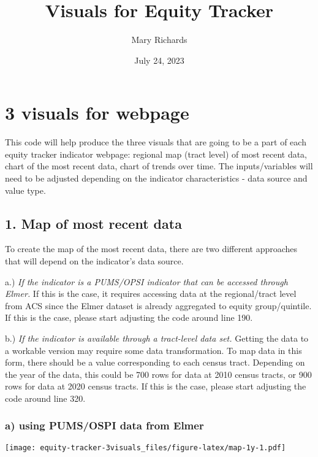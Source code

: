 \documentclass[
]{article}
\title{Visuals for Equity Tracker}
\author{Mary Richards}
\date{July 24, 2023}
\begin{document}
\maketitle

{
\setcounter{tocdepth}{6}
\tableofcontents
}
\hypertarget{visuals-for-webpage}{%
\section{3 visuals for webpage}\label{visuals-for-webpage}}

This code will help produce the three visuals that are going to be a
part of each equity tracker indicator webpage: regional map (tract
level) of most recent data, chart of the most recent data, chart of
trends over time. The inputs/variables will need to be adjusted
depending on the indicator characteristics - data source and value type.

\hypertarget{map-of-most-recent-data}{%
\subsection{1. Map of most recent data}\label{map-of-most-recent-data}}

To create the map of the most recent data, there are two different
approaches that will depend on the indicator's data source.

a.) \emph{If the indicator is a PUMS/OPSI indicator that can be accessed
through Elmer.} If this is the case, it requires accessing data at the
regional/tract level from ACS since the Elmer dataset is already
aggregated to equity group/quintile. If this is the case, please start
adjusting the code around line 190.

b.) \emph{If the indicator is available through a tract-level data set.}
Getting the data to a workable version may require some data
transformation. To map data in this form, there should be a value
corresponding to each census tract. Depending on the year of the data,
this could be 700 rows for data at 2010 census tracts, or 900 rows for
data at 2020 census tracts. If this is the case, please start adjusting
the code around line 320.

\hypertarget{a-using-pumsospi-data-from-elmer}{%
\subsubsection{a) using PUMS/OSPI data from
Elmer}\label{a-using-pumsospi-data-from-elmer}}

\texttt{[image: equity-tracker-3visuals\_files/figure-latex/map-1y-1.pdf]}
\end{document}
